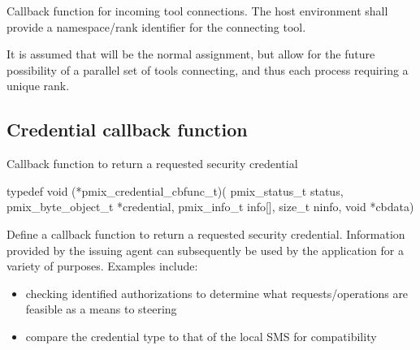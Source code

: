 \descr

Callback function for incoming tool connections.
The host environment shall provide a namespace/rank identifier for the connecting tool.

\advicermstart
It is assumed that  will be the normal assignment, but allow for the future possibility of a parallel set of tools connecting, and thus each process requiring a unique rank.
\advicermend

\subsection{Credential callback function}

\summary

Callback function to return a requested security credential

\format

\cspecificstart
\begin{codepar}
typedef void (*pmix_credential_cbfunc_t)(
                             pmix_status_t status,
                             pmix_byte_object_t *credential,
                             pmix_info_t info[], size_t ninfo,
                             void *cbdata)
\end{codepar}
\cspecificend

\begin{arglist}
\end{arglist}

\descr

Define a callback function to return a requested security credential. Information provided by the issuing agent can subsequently be used
by the application for a variety of purposes. Examples include:

\begin{itemize}
    \item checking identified authorizations to determine what requests/operations are feasible as a means to steering 
    \item compare the credential type to that of the local SMS for compatibility
\end{itemize}

